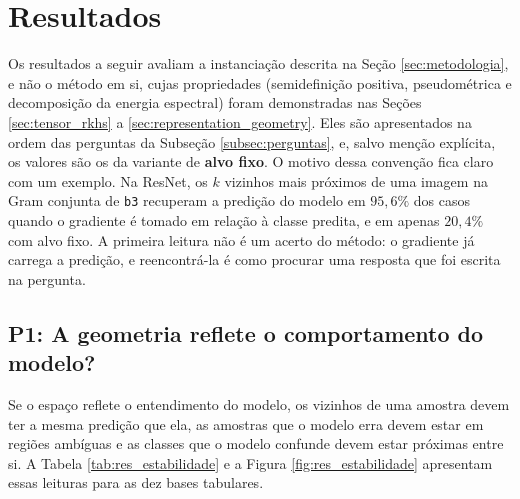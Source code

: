 \section{Resultados}\label{sec:resultados}

Os resultados a seguir avaliam a instanciação descrita na Seção \ref{sec:metodologia}, e não o método em si, cujas propriedades (semidefinição positiva, pseudométrica e decomposição da energia espectral) foram demonstradas nas Seções \ref{sec:tensor_rkhs} a \ref{sec:representation_geometry}. Eles são apresentados na ordem das perguntas da Subseção \ref{subsec:perguntas}, e, salvo menção explícita, os valores são os da variante de \textbf{alvo fixo}. O motivo dessa convenção fica claro com um exemplo. Na ResNet, os $k$ vizinhos mais próximos de uma imagem na Gram conjunta de \texttt{b3} recuperam a predição do modelo em $95{,}6\%$ dos casos quando o gradiente é tomado em relação à classe predita, e em apenas $20{,}4\%$ com alvo fixo. A primeira leitura não é um acerto do método: o gradiente já carrega a predição, e reencontrá-la é como procurar uma resposta que foi escrita na pergunta.

\subsection{P1: A geometria reflete o comportamento do modelo?}\label{subsec:res_comportamento}

Se o espaço reflete o entendimento do modelo, os vizinhos de uma amostra devem ter a mesma predição que ela, as amostras que o modelo erra devem estar em regiões ambíguas e as classes que o modelo confunde devem estar próximas entre si. A Tabela \ref{tab:res_estabilidade} e a Figura \ref{fig:res_estabilidade} apresentam essas leituras para as dez bases tabulares.

